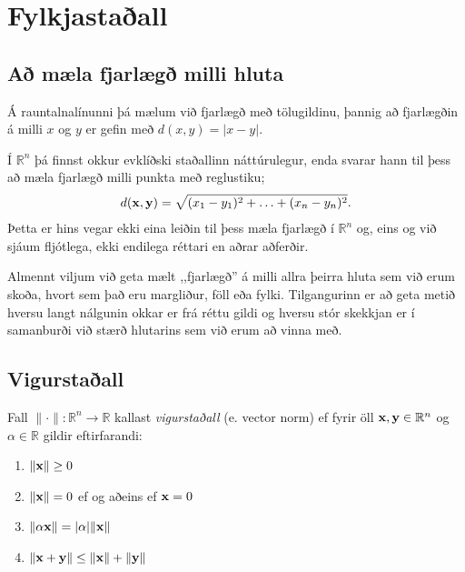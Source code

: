 \documentclass[letterpaper,10pt,icelandic]{sphinxmanual}
\begin{document}

\section{Fylkjastaðall}
\label{kafli08:index-7}\label{kafli08:fylkjastaall}

\subsection{Að mæla fjarlægð milli hluta}
\label{kafli08:a-maela-fjarlaeg-milli-hluta}
Á rauntalnalínunni þá mælum við fjarlægð með tölugildinu, þannig að
fjarlægðin á milli \(x\) og \(y\) er gefin með
\(d(x,y)=|x-y|\).

Í \(\mathbb R^n\) þá finnst okkur evklíðski staðallinn
náttúrulegur, enda svarar hann til þess að mæla fjarlægð milli punkta
með reglustiku;
\begin{gather}
\begin{split}d(\mbox{${\bf x}$},\mbox{${\bf y}$}) = \sqrt{ (x_1-y_1)^2 + \ldots + (x_n-y_n)^2 }.\end{split}\notag
\end{gather}
Þetta er hins vegar ekki eina leiðin til þess mæla fjarlægð í
\({\mathbb  R}^n\) og, eins og við sjáum fljótlega, ekki endilega
réttari en aðrar aðferðir.

Almennt viljum við geta mælt ,,fjarlægð'' á milli allra þeirra hluta
sem við erum skoða, hvort sem það eru margliður, föll eða fylki.
Tilgangurinn er að geta metið hversu langt nálgunin okkar er frá réttu
gildi og hversu stór skekkjan er í samanburði við stærð hlutarins sem
við erum að vinna með.


\subsection{Vigurstaðall}
\label{kafli08:vigurstadall}\label{kafli08:index-8}\label{kafli08:vigurstaall}
Fall \(\| \cdot\|:{\mathbb  R}^n \to {\mathbb  R}\) kallast
\emph{vigurstaðall} (e. vector norm) ef fyrir öll
\(\mbox{${\bf x}$},\mbox{${\bf y}$}\in {\mathbb  R}^n\) og
\(\alpha \in {\mathbb  R}\) gildir eftirfarandi:
\begin{enumerate}
\item {} 
\(\|\mbox{${\bf x}$}\| \geq 0\)

\item {} 
\(\|\mbox{${\bf x}$}\| = 0\) ef og aðeins ef
\(\mbox{${\bf x}$}= 0\)

\item {} 
\(\|\alpha\mbox{${\bf x}$}\| = |\alpha|\|\mbox{${\bf x}$}\|\)

\item {} 
\(\|\mbox{${\bf x}$}+\mbox{${\bf y}$}\| \leq \|\mbox{${\bf x}$}\| + \|\mbox{${\bf y}$}\|\)

\end{enumerate}
\end{document}
